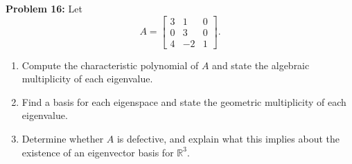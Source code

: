 \documentclass[11pt, letterpaper]{article}
\theoremstyle{definition}
\theoremstyle{remark}
\begin{document}
\vspace{0.4em}
\textbf{Problem 16:}
Let
\[
A = \begin{bmatrix} 3 & 1 & 0 \\ 0 & 3 & 0 \\ 4 & -2 & 1 \end{bmatrix}.
\]
\begin{enumerate}[label=(\alph*)]
    \item Compute the characteristic polynomial of $A$ and state the algebraic multiplicity of each eigenvalue.
    \item Find a basis for each eigenspace and state the geometric multiplicity of each eigenvalue.
    \item Determine whether $A$ is defective, and explain what this implies about the existence of an eigenvector basis for $\mathbb{R}^3$.
\end{enumerate}
\end{document}

